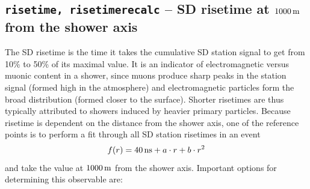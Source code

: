 \documentclass[12pt,a4paper]{report}
\begin{document}
\subsection{\texttt{risetime, risetimerecalc} -- SD risetime at $\unit[1000]{m}$ from the shower axis}
The SD risetime is the time it takes the cumulative SD station signal to get from 10\% to 50\% of its maximal value. It is an indicator of electromagnetic versus muonic content in a shower, since muons produce sharp peaks in the station signal (formed high in the atmosphere) and electromagnetic particles form the broad distribution (formed closer to the surface). Shorter risetimes are thus typically attributed to showers induced by heavier primary particles. Because risetime is dependent on the distance from the shower axis, one of the reference points is to perform a fit through all SD station risetimes in an event
\begin{equation}\label{eq:risetimeFit}
f(r) = \unit[40]{ns} + a\cdot r + b\cdot r^2
\end{equation}
and take the value at $\unit[1000]{m}$ from the shower axis. Important options for determining this observable are:
\end{document}
